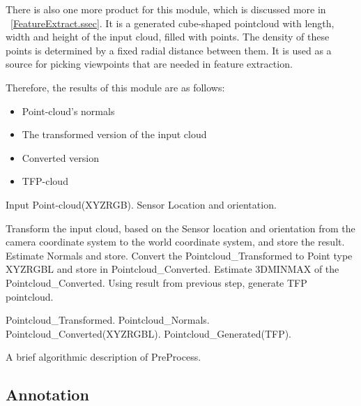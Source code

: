  There is also one more product for this module, which is discussed more in ~\ref{FeatureExtract.ssec}.
 It is a generated cube-shaped pointcloud with length, width and height of the input cloud, filled with points.
 The density of these points is determined by a fixed radial distance between them.
 It is used as a source for picking viewpoints that are needed in feature extraction.
 
 Therefore, the results of this module are as follows:
 \begin{itemize}
  \item Point-cloud's normals
  \item The transformed version of the input cloud
  \item Converted version
  \item TFP-cloud
 \end{itemize}
 
\begin{algorithm}[t]
\begin{algorithmic}[1]
\REQUIRE Input Point-cloud(XYZRGB).
\REQUIRE Sensor Location and orientation.
\medskip

\STATE Transform the input cloud, based on the Sensor location and orientation from the camera coordinate system to the world coordinate system, and store the 
result.
\STATE Estimate Normals and store.
\STATE Convert the Pointcloud\_Transformed to Point type XYZRGBL and store in Pointcloud\_Converted.
\STATE Estimate 3DMINMAX of the Pointcloud\_Converted.
\STATE Using result from previous step, generate TFP pointcloud.

\medskip
\ENSURE Pointcloud\_Transformed.
\ENSURE Pointcloud\_Normals.
\ENSURE Pointcloud\_Converted(XYZRGBL).
\ENSURE Pointcloud\_Generated(TFP).

\end{algorithmic}
\caption[PreProcess.]
{A brief algorithmic description of PreProcess.}
\label{Preprocess.algorithm}
\end{algorithm}



 
 
\subsection{Annotation}
\label{Annotation.ssec}



